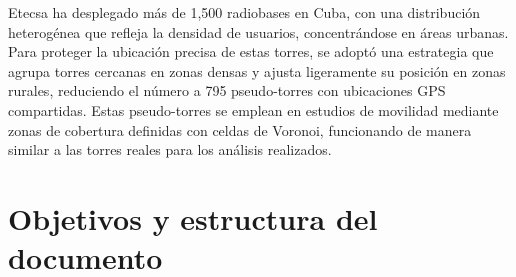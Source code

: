 Etecsa ha desplegado más de 1,500 radiobases en Cuba, con una distribución heterogénea que refleja la densidad de usuarios, concentrándose en áreas urbanas. Para proteger la ubicación precisa de estas torres, se adoptó una estrategia que agrupa torres cercanas en zonas densas y ajusta ligeramente su posición en zonas rurales, reduciendo el número a 795 pseudo-torres con ubicaciones GPS compartidas. Estas pseudo-torres se emplean en estudios de movilidad mediante zonas de cobertura definidas con celdas de Voronoi, funcionando de manera similar a las torres reales para los análisis realizados.



\section*{Objetivos y estructura del documento}

